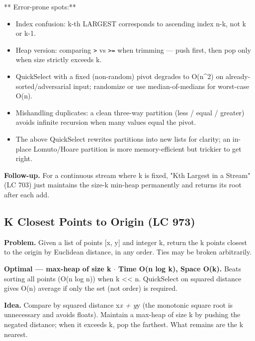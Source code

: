 \documentclass[11pt]{article}
\providecommand{\tightlist}{\setlength{\itemsep}{1pt}\setlength{\parskip}{0pt}}
\begin{document}
** Error-prone spots:**

\begin{itemize}
\tightlist
\item
  Index confusion: k-th LARGEST corresponds to ascending index n-k, not k or k-1.
\item
  Heap version: comparing \texttt{\textgreater{}} vs \texttt{\textgreater{}=} when trimming --- push first, then pop only when size strictly exceeds k.
\item
  QuickSelect with a fixed (non-random) pivot degrades to O(n\^{}2) on already-sorted/adversarial input; randomize or use median-of-medians for worst-case O(n).
\item
  Mishandling duplicates: a clean three-way partition (less / equal / greater) avoids infinite recursion when many values equal the pivot.
\item
  The above QuickSelect rewrites partitions into new lists for clarity; an in-place Lomuto/Hoare partition is more memory-efficient but trickier to get right.
\end{itemize}

\textbf{Follow-up.} For a continuous stream where k is fixed, "Kth Largest in a Stream" (LC 703) just maintains the size-k min-heap permanently and returns its root after each add.

\subsection{K Closest Points to Origin (LC 973)}\label{k-closest-points-to-origin-lc-973}

\textbf{Problem.} Given a list of points {[}x, y{]} and integer k, return the k points closest to the origin by Euclidean distance, in any order. Ties may be broken arbitrarily.

\textbf{Optimal --- max-heap of size k \(\cdot\) Time O(n log k), Space O(k).} Beats sorting all points (O(n log n)) when k \textless\textless{} n. QuickSelect on squared distance gives O(n) average if only the set (not order) is required.

\textbf{Idea.} Compare by squared distance x\emph{x + y}y (the monotonic square root is unnecessary and avoids floats). Maintain a max-heap of size k by pushing the negated distance; when it exceeds k, pop the farthest. What remains are the k nearest.

\end{document}
